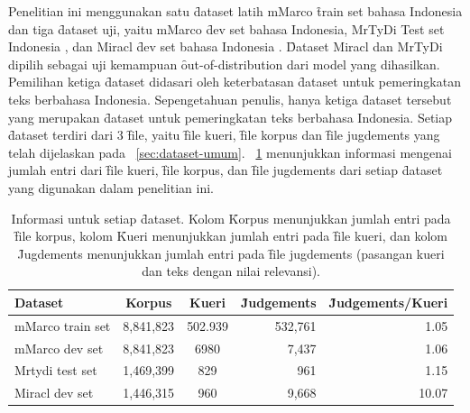 Penelitian ini menggunakan satu \f{dataset} latih mMarco \f{train set} bahasa Indonesia \citep{mmarco} dan tiga \f{dataset} uji, yaitu mMarco \f{dev set} bahasa Indonesia, MrTyDi Test set Indonesia \citep{mrtydi}, dan Miracl \f{dev set} bahasa Indonesia \citep{miracl}. \f{Dataset} Miracl dan MrTyDi dipilih sebagai uji kemampuan \f{out-of-distribution} dari model yang dihasilkan. Pemilihan ketiga \f{dataset} didasari oleh keterbatasan \f{dataset} untuk pemeringkatan teks berbahasa Indonesia. Sepengetahuan penulis, hanya ketiga \f{dataset} tersebut yang merupakan \f{dataset} untuk pemeringkatan teks berbahasa Indonesia. Setiap \f{dataset} terdiri dari 3 \f{file}, yaitu \f{file} kueri, \f{file} korpus dan \f{file jugdements} yang telah dijelaskan pada \sect~\ref{sec:dataset-umum}. \tab~\ref{tab:dataset-info} menunjukkan informasi mengenai jumlah entri dari \f{file} kueri, \f{file} korpus, dan \f{file jugdements} dari setiap \f{dataset} yang digunakan dalam penelitian ini.
\begin{table}[!ht]
    \centering
    \caption{Informasi untuk setiap \f{dataset}. Kolom \f{Korpus} menunjukkan jumlah entri pada \f{file korpus}, kolom \f{Kueri} menunjukkan jumlah entri pada \f{file kueri}, dan kolom \f{Jugdements} menunjukkan jumlah entri pada \f{file jugdements} (pasangan kueri dan teks dengan nilai relevansi).}
    \label{tab:dataset-info}
    \begin{tabular}{|l|c|c|r| r|} \hline
        \textbf{Dataset} & \textbf{Korpus} & \textbf{Kueri} & \textbf{\f{Judgements}} & \textbf{\f{Judgements}/Kueri} \\ \hline
        mMarco train set & 8,841,823       & 502.939        & 532,761             & 1.05                         \\ \hline
        mMarco dev set   & 8,841,823       & 6980           & 7,437               & 1.06                         \\ \hline
        Mrtydi test set  & 1,469,399       & 829            & 961                 & 1.15                        \\ \hline
        Miracl dev set   & 1,446,315       & 960            & 9,668               & 10.07                       \\ \hline
    \end{tabular}
\end{table}


